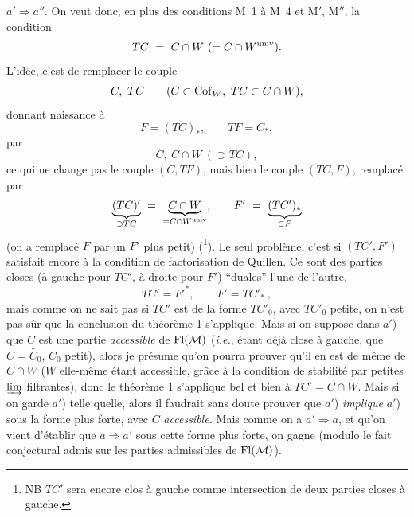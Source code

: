 $a' \Longrightarrow a''$. On veut donc, en plus des conditions M~1 à M~4 et M$'$, M$''$, la condition
\[ TC \ =\ C \cap W\ (= C \cap W^{\mathrm{univ}}). \]
L'idée, c'est de remplacer le couple
\[ C,\ TC \qquad (C \subset \mathrm{Cof}_W,\ TC \subset C \cap W), \]
donnant naissance à
\[ F = (TC)_*, \qquad TF = C_*, \]
par
\[ C,\ C \cap W\ (\supset TC), \]
ce qui ne change pas le couple $(C, TF)$, mais bien le couple $(TC, F)$, remplacé par
\[ \underbrace{(TC)'}_{\supset TC} \ =\ \underbrace{C \cap W}_{= C\cap W^{\univ}}, \qquad F' \ =\ \underbrace{(TC')_*}_{\subset F} \]
(on a remplacé $F$ par un $F'$ plus petit) (\footnote[14]{NB $TC'$ sera encore clos à gauche comme intersection de deux parties closes à gauche.}). Le seul problème, c'est si $(TC', F')$ satisfait encore à la condition de factorisation de Quillen. Ce sont des parties closes (à gauche pour $TC'$, à droite pour $F'$) “duales” l'une de l'autre,
\[ TC' = F'^*, \qquad F' = TC'_* \ , \]
mais comme on ne sait pas si $TC'$ est de la forme $\widetilde{TC'_0}$, avec $TC'_0$ petite, on n'est pas sûr que la conclusion du théorème 1 s'applique. Mais si on suppose dans $a'$) que $C$ est une partie \textit{accessible} de $\mathrm{Fl}(\mathcal{M})$ (\textit{i.e.}, étant déjà close à gauche, que $C = \widetilde{C_0}$, $C_0$ petit),
alors je présume qu'on pourra prouver qu'il en est de même de $C \cap W$ ($W$ elle-même étant accessible, grâce à la condition de stabilité par petites $\varinjlim$ filtrantes), donc le théorème 1 s'applique bel et bien à $TC' = C \cap W$. Mais si on garde $a'$) telle quelle, alors il faudrait sans doute prouver que $a'$) \textit{implique} $a'$) sous la forme plus forte, avec $C$ \textit{accessible.} Mais comme on a $a' \Longrightarrow a$, et qu'on vient d'établir que $a \Longrightarrow a'$ sous cette forme plus forte, on gagne (modulo le fait conjectural admis sur les parties admissibles de $\mathrm{Fl}(\mathcal{M})$).

